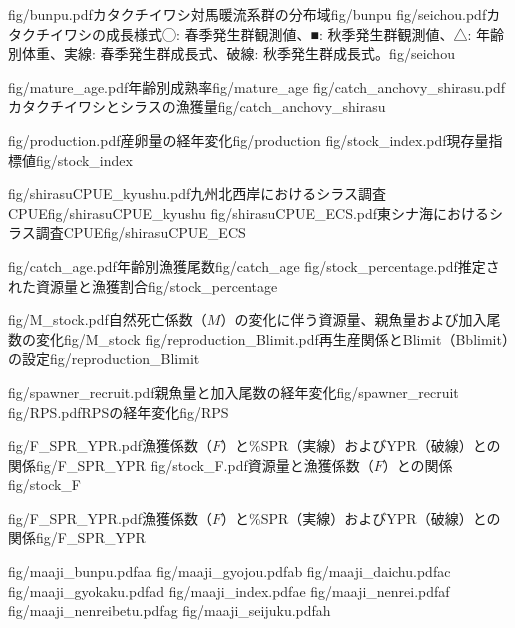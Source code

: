 \TwoOfSixFigs
{fig/bunpu.pdf}{カタクチイワシ対馬暖流系群の分布域}{fig/bunpu}
{fig/seichou.pdf}{カタクチイワシの成長様式\newline◯: 春季発生群観測値、■: 秋季発生群観測値、△: 年齢別体重、実線: 春季発生群成長式、破線: 秋季発生群成長式。}{fig/seichou}

\TwoOfSixFigs
{fig/mature_age.pdf}{年齢別成熟率}{fig/mature_age}
{fig/catch_anchovy_shirasu.pdf}{カタクチイワシとシラスの漁獲量}{fig/catch_anchovy_shirasu}

\TwoOfSixFigs
{fig/production.pdf}{産卵量の経年変化}{fig/production}
{fig/stock_index.pdf}{現存量指標値}{fig/stock_index}

\TwoOfSixFigs
{fig/shirasuCPUE_kyushu.pdf}{九州北西岸におけるシラス調査CPUE}{fig/shirasuCPUE_kyushu}
{fig/shirasuCPUE_ECS.pdf}{東シナ海におけるシラス調査CPUE}{fig/shirasuCPUE_ECS}

\TwoOfSixFigs
{fig/catch_age.pdf}{年齢別漁獲尾数}{fig/catch_age}
{fig/stock_percentage.pdf}{推定された資源量と漁獲割合}{fig/stock_percentage}

\TwoOfSixFigs
{fig/M_stock.pdf}{自然死亡係数（$M$）の変化に伴う資源量、親魚量および加入尾数の変化}{fig/M_stock}
{fig/reproduction_Blimit.pdf}{再生産関係とBlimit（Bblimit）の設定}{fig/reproduction_Blimit}

\TwoOfSixFigs
{fig/spawner_recruit.pdf}{親魚量と加入尾数の経年変化}{fig/spawner_recruit}
{fig/RPS.pdf}{RPSの経年変化}{fig/RPS}

\TwoOfSixFigs
{fig/F_SPR_YPR.pdf}{漁獲係数（$F$）と\%SPR（実線）およびYPR（破線）との関係}{fig/F_SPR_YPR}
{fig/stock_F.pdf}{資源量と漁獲係数（$F$）との関係}{fig/stock_F}

\OneOfSixFigs
{fig/F_SPR_YPR.pdf}{漁獲係数（$F$）と\%SPR（実線）およびYPR（破線）との関係}{fig/F_SPR_YPR}


\TwoOfEightFigs
{fig/maaji_bunpu.pdf}{a}{a}
{fig/maaji_gyojou.pdf}{a}{b}
\TwoOfEightFigs
{fig/maaji_daichu.pdf}{a}{c}
{fig/maaji_gyokaku.pdf}{a}{d}
\TwoOfEightFigs
{fig/maaji_index.pdf}{a}{e}
{fig/maaji_nenrei.pdf}{a}{f}
\TwoOfEightFigs
{fig/maaji_nenreibetu.pdf}{a}{g}
{fig/maaji_seijuku.pdf}{a}{h}
